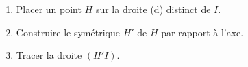 \begin{methode*1}
\begin{minipage}{0.65\linewidth}
\begin{enumerate}
                \item Placer un point $H$ sur la droite (d) distinct de $I$.
                \item Construire le symétrique $H'$ de $H$ par rapport à l'axe.
                \item Tracer la droite $(H'I)$.
            \end{enumerate}
        \end{minipage}
        \begin{myBox}{}
            \begin{minipage}{\linewidth}
            
                \creditInstrumentPoche
            \end{minipage}
        \end{myBox}
    \end{methode*1}

